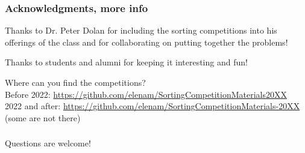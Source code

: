 \documentclass{beamer}
\begin{document}
\begin{frame}
\frametitle{Acknowledgments, more info}
Thanks to Dr. Peter Dolan for including the sorting competitions into his offerings of the class and for collaborating on putting together the problems!

Thanks to students and alumni for keeping it interesting and fun!

\vspace*{0.1in}

Where can you find the competitions? \\ 

Before 2022:  \url{https://github.com/elenam/SortingCompetitionMaterials20XX} \\
2022 and after: \url{https://github.com/elenam/SortingCompetitionMaterials-20XX} \\
(some are not there)

 
\end{frame}

\begin{frame}
\frametitle{}
\qquad\qquad\qquad\huge{Questions are welcome!}
\end{frame}
\end{document}
